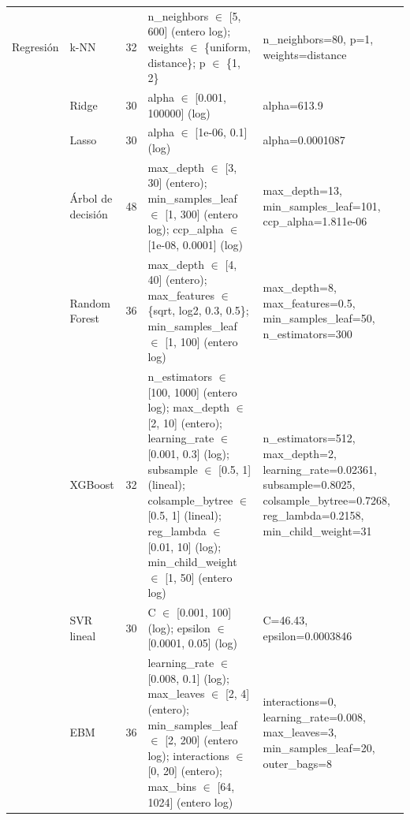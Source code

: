 \begin{table}
\begin{tabular}{llr>{\raggedright\arraybackslash}p{6.2cm}>{\raggedright\arraybackslash}p{5cm}}
Regresión & k-NN & 32 & n\_neighbors $\in$ [5, 600] (entero log); weights $\in$ \{uniform, distance\}; p $\in$ \{1, 2\} & n\_neighbors=80, p=1, weights=distance \\
 & Ridge & 30 & alpha $\in$ [0.001, 100000] (log) & alpha=613.9 \\
 & Lasso & 30 & alpha $\in$ [1e-06, 0.1] (log) & alpha=0.0001087 \\
 & Árbol de decisión & 48 & max\_depth $\in$ [3, 30] (entero); min\_samples\_leaf $\in$ [1, 300] (entero log); ccp\_alpha $\in$ [1e-08, 0.0001] (log) & max\_depth=13, min\_samples\_leaf=101, ccp\_alpha=1.811e-06 \\
 & Random Forest & 36 & max\_depth $\in$ [4, 40] (entero); max\_features $\in$ \{sqrt, log2, 0.3, 0.5\}; min\_samples\_leaf $\in$ [1, 100] (entero log) & max\_depth=8, max\_features=0.5, min\_samples\_leaf=50, n\_estimators=300 \\
 & XGBoost & 32 & n\_estimators $\in$ [100, 1000] (entero log); max\_depth $\in$ [2, 10] (entero); learning\_rate $\in$ [0.001, 0.3] (log); subsample $\in$ [0.5, 1] (lineal); colsample\_bytree $\in$ [0.5, 1] (lineal); reg\_lambda $\in$ [0.01, 10] (log); min\_child\_weight $\in$ [1, 50] (entero log) & n\_estimators=512, max\_depth=2, learning\_rate=0.02361, subsample=0.8025, colsample\_bytree=0.7268, reg\_lambda=0.2158, min\_child\_weight=31 \\
 & SVR lineal & 30 & C $\in$ [0.001, 100] (log); epsilon $\in$ [0.0001, 0.05] (log) & C=46.43, epsilon=0.0003846 \\
 & EBM & 36 & learning\_rate $\in$ [0.008, 0.1] (log); max\_leaves $\in$ [2, 4] (entero); min\_samples\_leaf $\in$ [2, 200] (entero log); interactions $\in$ [0, 20] (entero); max\_bins $\in$ [64, 1024] (entero log) & interactions=0, learning\_rate=0.008, max\_leaves=3, min\_samples\_leaf=20, outer\_bags=8 \\
\bottomrule
\end{tabular}
\end{table}
